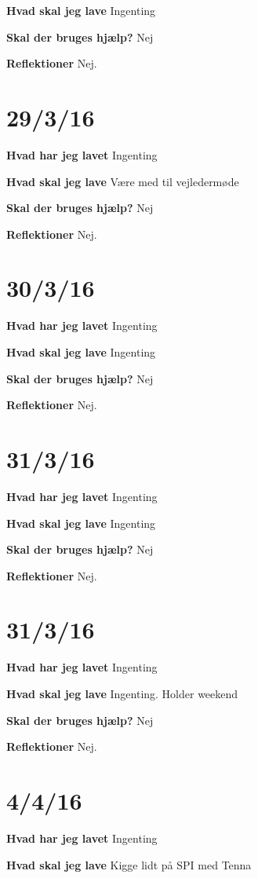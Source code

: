\documentclass{article}
\begin{document}
	\textbf{Hvad skal jeg lave}
	Ingenting

	\textbf{Skal der bruges hjælp?}
	Nej
	
	\textbf{Reflektioner}
	Nej.
	
	\section{29/3/16}
	\textbf{Hvad har jeg lavet}
	Ingenting
	
	\textbf{Hvad skal jeg lave}
	Være med til vejledermøde
	
	\textbf{Skal der bruges hjælp?}
	Nej
	
	\textbf{Reflektioner}
	Nej.
	
	\section{30/3/16}
	\textbf{Hvad har jeg lavet}
	Ingenting
	
	\textbf{Hvad skal jeg lave}
	Ingenting
	
	\textbf{Skal der bruges hjælp?}
	Nej
	
	\textbf{Reflektioner}
	Nej.
		
	\section{31/3/16}
	\textbf{Hvad har jeg lavet}
	Ingenting
	
	\textbf{Hvad skal jeg lave}
	Ingenting
	
	\textbf{Skal der bruges hjælp?}
	Nej
	
	\textbf{Reflektioner}
	Nej.
			
	\section{31/3/16}
	\textbf{Hvad har jeg lavet}
	Ingenting
	
	\textbf{Hvad skal jeg lave}
	Ingenting. Holder weekend
	
	\textbf{Skal der bruges hjælp?}
	Nej
	
	\textbf{Reflektioner}
	Nej.
				
	\section{4/4/16}
	\textbf{Hvad har jeg lavet}
	Ingenting
	
	\textbf{Hvad skal jeg lave}
	Kigge lidt på SPI med Tenna
	
\end{document}
